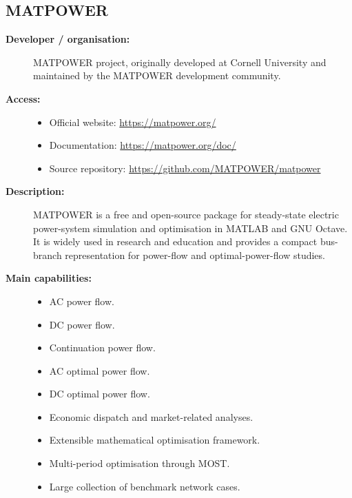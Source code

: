 
\subsection{MATPOWER}

\begin{description}

    \item[\textbf{Developer / organisation:}]
    MATPOWER project, originally developed at Cornell University and
    maintained by the MATPOWER development community.

    \item[\textbf{Access:}] \hfill
    \begin{itemize}
        \item Official website:
        \url{https://matpower.org/}

        \item Documentation:
        \url{https://matpower.org/doc/}

        \item Source repository:
        \url{https://github.com/MATPOWER/matpower}
    \end{itemize}

    \item[\textbf{Description:}]
    MATPOWER is a free and open-source package for steady-state electric
    power-system simulation and optimisation in MATLAB and GNU Octave.
    It is widely used in research and education and provides a compact
    bus-branch representation for power-flow and optimal-power-flow studies.

    \item[\textbf{Main capabilities:}] \hfill
    \begin{itemize}
        \item AC power flow.
        \item DC power flow.
        \item Continuation power flow.
        \item AC optimal power flow.
        \item DC optimal power flow.
        \item Economic dispatch and market-related analyses.
        \item Extensible mathematical optimisation framework.
        \item Multi-period optimisation through MOST.
        \item Large collection of benchmark network cases.
    \end{itemize}


\end{description}
